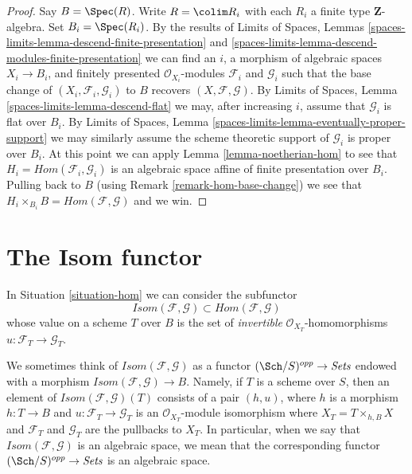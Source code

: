 \begin{proof}
\medskip\noindent
Say $B = \Spec(R)$. Write $R = \colim R_i$ with each $R_i$ a finite
type $\mathbf{Z}$-algebra. Set $B_i = \Spec(R_i)$. By the results of
Limits of Spaces, Lemmas
\ref{spaces-limits-lemma-descend-finite-presentation} and
\ref{spaces-limits-lemma-descend-modules-finite-presentation}
we can find an $i$, a morphism of algebraic spaces $X_i \to B_i$,
and finitely presented $\mathcal{O}_{X_i}$-modules $\mathcal{F}_i$ and
$\mathcal{G}_i$ such that the base change of
$(X_i, \mathcal{F}_i, \mathcal{G}_i)$ to $B$ recovers
$(X, \mathcal{F}, \mathcal{G})$. By
Limits of Spaces, Lemma \ref{spaces-limits-lemma-descend-flat}
we may, after increasing $i$, assume that $\mathcal{G}_i$
is flat over $B_i$. By
Limits of Spaces, Lemma \ref{spaces-limits-lemma-eventually-proper-support}
we may similarly assume the scheme theoretic support of $\mathcal{G}_i$
is proper over $B_i$. At this point we can apply
Lemma \ref{lemma-noetherian-hom}
to see that $H_i = \mathit{Hom}(\mathcal{F}_i, \mathcal{G}_i)$ is
an algebraic space affine of finite presentation over $B_i$.
Pulling back to $B$ (using Remark \ref{remark-hom-base-change})
we see that $H_i \times_{B_i} B = \mathit{Hom}(\mathcal{F}, \mathcal{G})$ 
and we win.
\end{proof}






\section{The Isom functor}
\label{section-isom}

\noindent
In Situation \ref{situation-hom} we can consider the subfunctor
$$
\mathit{Isom}(\mathcal{F}, \mathcal{G}) \subset
\mathit{Hom}(\mathcal{F}, \mathcal{G})
$$
whose value on a scheme $T$ over $B$ is the set of {\it invertible}
$\mathcal{O}_{X_T}$-homomorphisms $u : \mathcal{F}_T \to \mathcal{G}_T$.

\medskip\noindent
We sometimes think of
$\mathit{Isom}(\mathcal{F}, \mathcal{G})$ as a functor
$(\Sch/S)^{opp} \to \textit{Sets}$
endowed with a morphism
$\mathit{Isom}(\mathcal{F}, \mathcal{G}) \to B$.
Namely, if $T$ is a scheme over $S$, then an element of
$\mathit{Isom}(\mathcal{F}, \mathcal{G})(T)$ consists of a pair
$(h, u)$, where $h$ is a morphism $h : T \to B$ and
$u : \mathcal{F}_T \to \mathcal{G}_T$ is an $\mathcal{O}_{X_T}$-module
isomorphism
where $X_T = T \times_{h, B} X$ and $\mathcal{F}_T$ and $\mathcal{G}_T$
are the pullbacks to $X_T$. In particular, when we say
that $\mathit{Isom}(\mathcal{F}, \mathcal{G})$ is an algebraic space,
we mean that the corresponding functor
$(\Sch/S)^{opp} \to \textit{Sets}$ is an algebraic space.

